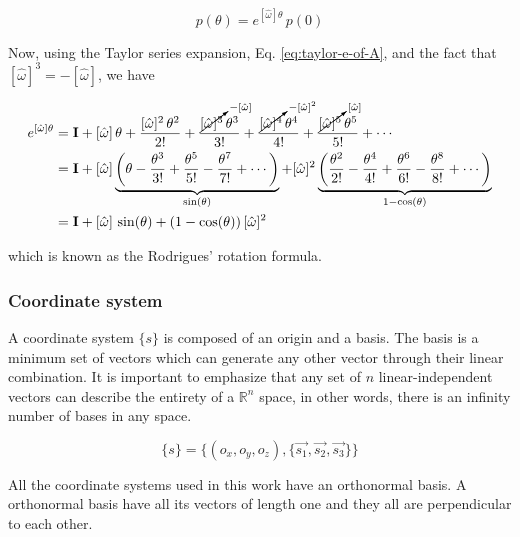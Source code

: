 \documentclass[12pt]{article}
\begin{document}
\begin{equation}
    p(\theta) = e^{\left[ \hat{\omega} \right] \theta} \, p(0)
    \label{eq:rotation=of-theta-around-omega}
\end{equation}

Now, using the Taylor series expansion, Eq. \ref{eq:taylor-e-of-A}, and the fact that $[\hat{\omega}]^3 = -[\hat{\omega}]$, we have

\begin{equation}\begin{aligned}
    e^{[\hat{\omega}]\theta} &= \mathbf{I} + [\hat{\omega}] \, \theta + \frac{[\hat{\omega}]^2 \, \theta^2}{2!} + \frac{\cancelto{-[\hat{\omega}]}{[\hat{\omega}]^3} \, \theta^3}{3!} + \frac{\cancelto{-[\hat{\omega}]^2}{[\hat{\omega}]^4} \, \theta^4}{4!} + \frac{\cancelto{[\hat{\omega}]}{[\hat{\omega}]^5} \, \theta^5}{5!} + \cdots \\
    &= \mathbf{I} + [\hat{\omega}] \underbrace{\left( \theta - \frac{\theta^3}{3!} + \frac{\theta^5}{5!} - \frac{\theta^7}{7!} + \cdots \right)}_{\sin(\theta)} + [\hat{\omega}]^2 \underbrace{\left( \frac{\theta^2}{2!} - \frac{\theta^4}{4!} + \frac{\theta^6}{6!} - \frac{\theta^8}{8!} + \cdots \right)}_{1 - \cos(\theta)} \\
    &= \mathbf{I} + [\hat{\omega}] \, \sin(\theta) + (1 - \cos(\theta)) \, [\hat{\omega}]^2
\end{aligned}
\label{eq:rodrigues-rotation-matrix-formula}
\end{equation}

which is known as the Rodrigues' rotation formula.

\subsubsection{Coordinate system}
A coordinate system $\{s\}$ is composed of an origin and a basis. The basis is a minimum set of vectors which can generate any other vector through their linear combination. It is important to emphasize that any set of $n$ linear-independent vectors can describe the entirety of a $\mathbb{R}^n$ space, in other words, there is an infinity number of bases in any space.

\begin{equation}
    \{s\} = \{(o_x, o_y, o_z), \{\vec{s_1}, \vec{s_2}, \vec{s_3}\}\}
    \label{eq:coord-system}
\end{equation}

All the coordinate systems used in this work have an orthonormal basis. A orthonormal basis have all its vectors of length one and they all are perpendicular to each other. 
\end{document}
